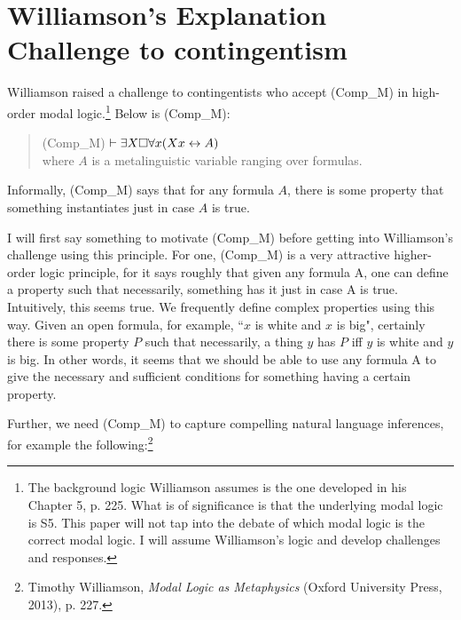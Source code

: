 \section{Williamson's Explanation Challenge to contingentism}
Williamson raised a challenge to contingentists who accept (Comp_M) in high-order modal logic.\footnote{The background logic Williamson assumes is the one developed in his Chapter 5, p. 225. What is of significance is that the underlying modal logic is S5. This paper will not tap into the debate of which modal logic is the correct modal logic. I will assume Williamson's logic and develop challenges and responses.}
Below is (Comp_M): 
\begin{quote}
(Comp_M) \hspace{\labelsep} $\vdash \exists X \Box \forall x (Xx \leftrightarrow A)$ \smallskip \\ where $A$ is a metalinguistic variable ranging over formulas. 
\end{quote}
Informally, (Comp_M) says that for any formula $A$, there is some property that something instantiates just in case $A$ is true.

I will first say something to motivate (Comp_M) before getting into Williamson's challenge using this principle. For one, (Comp_M) is a very attractive higher-order logic principle, for it says roughly that given any formula A, one can define a property such that necessarily, something has it just in case A is true. Intuitively, this seems true. We frequently define complex properties using this way. Given an open formula, for example, ``$x$ is white and $x$ is big", certainly there is some property $P$ such that necessarily, a thing $y$ has $P$ iff $y$ is white and $y$ is big. In other words, it seems that we should be able to use any formula A to give the necessary and sufficient conditions for something having a certain property. 

Further, we need (Comp_M) to capture compelling natural language inferences, for example the following:\footnote{Timothy Williamson, \textit{Modal Logic as Metaphysics} (Oxford University Press, 2013), p. 227.} 


